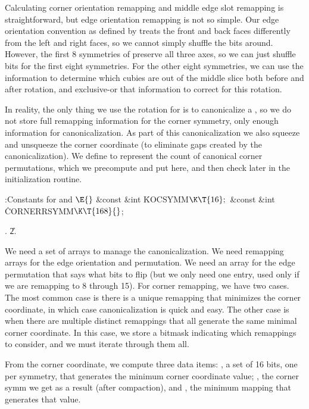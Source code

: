 Calculating corner orientation remapping and middle edge slot
remapping is straightforward, but edge orientation remapping is not so
simple.  Our edge orientation convention as defined by 
treats the front and back faces differently from the left and right
faces, so we cannot simply shuffle the bits around.  However, the
first 8 symmetries of  preserve all three axes, so we can
just shuffle bits for the first eight symmetries.  For the other eight
symmetries, we can use the  information to determine which
cubies are out of the middle slice both before and after rotation, and
exclusive-or that information to correct for this rotation.

In reality, the only thing we use the rotation for is to canonicalize
a , so we do not store full remapping information for the
corner symmetry, only enough information for canonicalization.  As
part of this canonicalization we also squeeze and unsqueeze the corner
coordinate (to eliminate gaps created by the canonicalization).  We
define  to represent the count of canonical corner
permutations, which we precompute and put here, and then check later
in the initialization routine.

\Y\B\4:Constants for  and \X${}\E{}$\6
\&{const} \&{int} \.{KOCSYMM}${}\K\T{16};{}$\6
\&{const} \&{int} \.{CORNERRSYMM}${}\K\T{168}{}$;\par
{}.
\U2.\fi

We need a set of arrays to manage the canonicalization.  We need
remapping arrays for the edge orientation and permutation.  We need an
array for the edge permutation that says what bits to flip (but we
only need one entry, used only if we are remapping to 8 through 15).
For corner remapping, we have two cases.  The most common case is
there is a unique remapping that minimizes the corner coordinate, in
which case canonicalization is quick and easy.  The other case is when
there are multiple distinct remappings that all generate the same
minimal corner coordinate.  In this case, we store a bitmask
indicating which remappings to consider, and we must iterate through
them all.

From the corner coordinate, we compute three data items: , a
set of 16 bits, one per symmetry, that generates the minimum corner
coordinate value; , the corner symm we get as a result (after
compaction), and , the minimum mapping that generates that
value.


